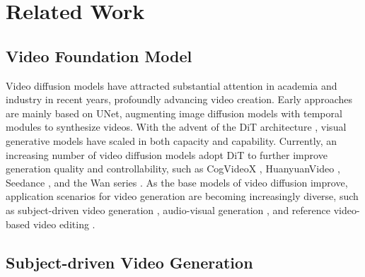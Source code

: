 \documentclass{llmxive}
\begin{document}
\section{Related Work}

\subsection{Video Foundation Model}

Video diffusion models have attracted substantial attention in academia and industry in recent years, profoundly advancing video creation. Early approaches \cite{ho2022video, svd,guo2024animatediff} are mainly based on UNet, augmenting image diffusion models with temporal modules to synthesize videos. With the advent of the DiT architecture \cite{DiT}, visual generative models have scaled in both capacity and capability. Currently, an increasing number of video diffusion models adopt DiT to further improve generation quality and controllability, such as CogVideoX \cite{yang2024cogvideox}, HuanyuanVideo \cite{kong2024hunyuanvideo}, Seedance \cite{chen2025seedance}, and the Wan series \cite{wan2025wan}. As the base models of video diffusion improve, application scenarios\cite{phantom,hunyuancustom,chen2025humo,ye2026unified,ye2026visual,cai2026foundation,ye2025stylemaster,yang2025infinitetalk,ditto1m,insvie,reco} for video generation are becoming increasingly diverse, such as subject-driven video generation \cite{phantom,hunyuancustom,chen2025humo}, audio-visual generation \cite{chen2025humo,yang2025infinitetalk}, and reference video-based video editing \cite{ditto1m,insvie,reco}. 


\subsection{Subject-driven Video Generation}
\end{document}
